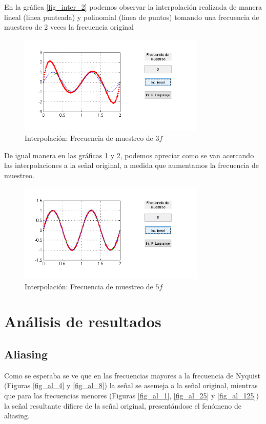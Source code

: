 \documentclass[comsoc, journal]{IEEEtran}
\begin{document}
En la gráfica \ref{fig_inter_2} podemos observar la interpolación realizada de manera lineal (linea punteada) y polinomial (linea de puntos) tomando una frecuencia de muestreo de 2 veces la frecuencia original


\begin{figure}[!t]
\centering
\includegraphics[width=3.5in]{imgs/inter3.png}
\caption{Interpolación: Frecuencia de muestreo de $3f$}
\label{fig_inter_3}
\end{figure}

De igual manera en las gráficas \ref{fig_inter_3} y \ref{fig_inter_5}, podemos apreciar como se van acercando las interpolaciones a la señal original, a medida que aumentamos la frecuencia de muestreo.


\begin{figure}[!t]
\centering
\includegraphics[width=3.5in]{imgs/inter5.png}
\caption{Interpolación: Frecuencia de muestreo de $5f$}
\label{fig_inter_5}
\end{figure}

\section{Análisis de resultados}
\subsection{Aliasing}
Como se esperaba se ve que en las frecuencias mayores a la frecuencia de Nyquist (Figuras \ref{fig_al_4} y \ref{fig_al_8}) la señal se asemeja a la señal original, mientras que para las frecuencias menores (Figuras \ref{fig_al_1}, \ref{fig_al_25} y \ref{fig_al_125}) la señal resultante difiere de la señal original, presentándose el fenómeno de aliasing.
\end{document}

